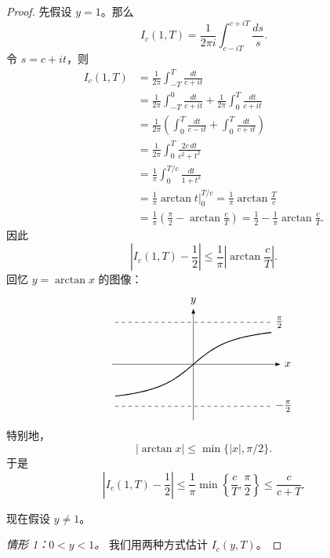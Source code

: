 \begin{proof}
	先假设 $y=1$。那么
	\[
		I_c(1,T)=\frac1{2\pi i}\int_{c-iT}^{c+iT}\frac{ds}{s}.
	\]
	令 $s=c+it$，则
	\[
	\begin{aligned}
		I_c(1,T)
		&=
		\frac1{2\pi}\int_{-T}^T\frac{dt}{c+it}\\
		&=
		\frac1{2\pi}\int_{-T}^0\frac{dt}{c+it}
		+
		\frac1{2\pi}\int_0^T\frac{dt}{c+it}\\
		&=
		\frac1{2\pi}\left(\int_0^T\frac{dt}{c-it}
		+
		\int_0^T\frac{dt}{c+it}\right)\\
		&=
		\frac1{2\pi}\int_0^T\frac{2c\,dt}{c^2+t^2}\\
		&=
		\frac1\pi\int_0^{T/c}\frac{dt}{1+t^2}\\
		&=
		\frac1\pi\arctan t\bigg|_0^{T/c}
		=
		\frac1\pi\arctan\frac{T}{c}\\
		&=
		\frac1\pi\left(\frac\pi2-\arctan\frac{c}{T}\right)
		=
		\frac12-\frac1\pi\arctan\frac{c}{T}.
	\end{aligned}
	\]
	因此
	\[
		\left|I_c(1,T)-\frac12\right|
		\leq
		\frac1\pi\left|\arctan\frac{c}{T}\right|.
	\]
	回忆 $y=\arctan x$ 的图像：
	\[
	\begin{tikzpicture}[baseline={(current bounding box.center)}, >=Latex, x=1cm, y=1cm]
		\draw[->] (-2.6,0) -- (2.8,0) node[right] {$x$};
		\draw[->] (0,-1.8) -- (0,1.8) node[above] {$y$};
		\draw[dashed] (-2.5,1.35) -- (2.5,1.35) node[right] {$\frac\pi2$};
		\draw[dashed] (-2.5,-1.35) -- (2.5,-1.35) node[right] {$-\frac\pi2$};
		\draw[thick, domain=-2.5:2.5, samples=100] plot (\x,{1.35*atan(\x)/90});
	\end{tikzpicture}
	\]
	特别地，
	\[
		|\arctan x|\leq \min\{|x|,\pi/2\}.
	\]
	于是
	\[
		\left|I_c(1,T)-\frac12\right|
		\leq
		\frac1\pi\min\left\{\frac{c}{T},\frac\pi2\right\}
		\leq
		\frac{c}{c+T}.
	\]

	现在假设 $y\neq 1$。

	\emph{情形 1：$0<y<1$。} 我们用两种方式估计 $I_c(y,T)$。


\end{proof}
